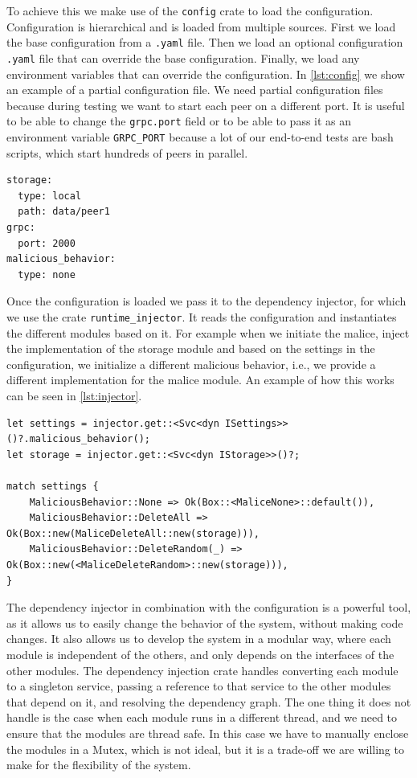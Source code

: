 To achieve this we make use of the \texttt{config} crate to load the configuration.
Configuration is hierarchical and is loaded from multiple sources.
First we load the base configuration from a \texttt{.yaml} file.
Then we load an optional configuration \texttt{.yaml} file that can override the base configuration.
Finally, we load any environment variables that can override the configuration.
In \autoref{lst:config} we show an example of a partial configuration file.
We need partial configuration files because during testing we want to start each peer on a different port.
It is useful to be able to change the \texttt{grpc.port} field or to be able to pass it as an
environment variable \texttt{GRPC\_PORT} because a lot of our end-to-end tests are bash scripts,
which start hundreds of peers in parallel.

\begin{lstlisting}[caption={Example of a configuration file}, label={lst:config}]
storage:
  type: local
  path: data/peer1
grpc:
  port: 2000
malicious_behavior:
  type: none
\end{lstlisting}

Once the configuration is loaded we pass it to the dependency injector,
for which we use the crate \texttt{runtime\_injector}.
It reads the configuration and instantiates the different modules based on it.
For example when we initiate the malice, inject the implementation of the storage module
and based on the settings in the configuration, we initialize a different malicious behavior,
i.e., we provide a different implementation for the malice module.
An example of how this works can be seen in \autoref{lst:injector}.

\begin{lstlisting}[caption={Example of dynamically loading a module}, label={lst:injector}]
let settings = injector.get::<Svc<dyn ISettings>>()?.malicious_behavior();
let storage = injector.get::<Svc<dyn IStorage>>()?;

match settings {
    MaliciousBehavior::None => Ok(Box::<MaliceNone>::default()),
    MaliciousBehavior::DeleteAll => Ok(Box::new(MaliceDeleteAll::new(storage))),
    MaliciousBehavior::DeleteRandom(_) => Ok(Box::new(<MaliceDeleteRandom>::new(storage))),
}
\end{lstlisting}

The dependency injector in combination with the configuration is a powerful tool,
as it allows us to easily change the behavior of the system, without making code changes.
It also allows us to develop the system in a modular way,
where each module is independent of the others, and only depends on the interfaces of the other modules.
The dependency injection crate handles converting each module to a singleton service,
passing a reference to that service to the other modules that depend on it,
and resolving the dependency graph.
The one thing it does not handle is the case when each module runs in a different thread,
and we need to ensure that the modules are thread safe.
In this case we have to manually enclose the modules in a Mutex,
which is not ideal, but it is a trade-off we are willing to make for the flexibility of the system.

